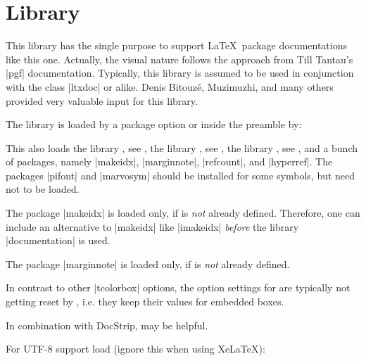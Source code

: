 \clearpage
\section{Library }\label{sec:documentation}%
%
This library has the single purpose to support \LaTeX\ package documentations
like this one. Actually, the visual nature follows the approach from
Till Tantau's |pgf| \cite{tantau:tikz_and_pgf} documentation.
Typically, this library is assumed to be used in conjunction with the
class |ltxdoc| or alike.
Denis Bitouz\'e, Muzimuzhi, and many others provided very valuable input for this library.

The library is loaded by a package option or inside the preamble by:
\begin{dispListing}
\end{dispListing}
This also loads
the library , see ,
the library , see ,
the library , see ,
and a bunch of packages, namely
|makeidx|, |marginnote|, |refcount|, and |hyperref|.
The packages |pifont| and |marvosym| should be installed for some symbols, but
need not to be loaded.

\begin{marker}
The package |makeidx| is loaded only, if  is
\emph{not} already defined. Therefore, one can include an alternative to |makeidx| like
|imakeidx| \emph{before} the library |documentation| is used.
\end{marker}
\begin{marker}
The package |marginnote| is loaded only, if  is
\emph{not} already defined.
\end{marker}
\begin{marker}
In contrast to other |tcolorbox| options, the option
settings for  are typically not
getting reset by , i.e. they keep their
values for embedded boxes.
\end{marker}
\begin{marker}
In combination with DocStrip,  may be helpful.
\end{marker}

For UTF-8 support load (ignore this when using Xe\LaTeX):
\begin{dispListing}
\end{dispListing}

